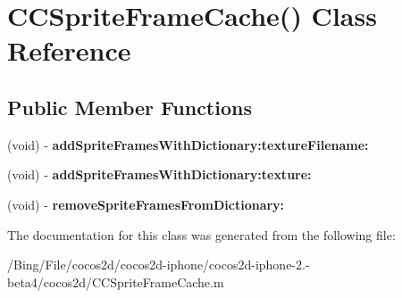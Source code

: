\hypertarget{interface_c_c_sprite_frame_cache_07_08}{\section{C\-C\-Sprite\-Frame\-Cache() Class Reference}
\label{interface_c_c_sprite_frame_cache_07_08}
}
\subsection*{Public Member Functions}
\begin{DoxyCompactItemize}
\item 
\hypertarget{interface_c_c_sprite_frame_cache_07_08_a87fa18af068793b885ccdc8ddec28c08}{(void) -\/ {\bfseries add\-Sprite\-Frames\-With\-Dictionary\-:texture\-Filename\-:}}\label{interface_c_c_sprite_frame_cache_07_08_a87fa18af068793b885ccdc8ddec28c08}

\item 
\hypertarget{interface_c_c_sprite_frame_cache_07_08_a539dc5fff1466f30d4b780003cdf7603}{(void) -\/ {\bfseries add\-Sprite\-Frames\-With\-Dictionary\-:texture\-:}}\label{interface_c_c_sprite_frame_cache_07_08_a539dc5fff1466f30d4b780003cdf7603}

\item 
\hypertarget{interface_c_c_sprite_frame_cache_07_08_a7d9c4b4256c1e30dad62e4c362f3d8ab}{(void) -\/ {\bfseries remove\-Sprite\-Frames\-From\-Dictionary\-:}}\label{interface_c_c_sprite_frame_cache_07_08_a7d9c4b4256c1e30dad62e4c362f3d8ab}

\end{DoxyCompactItemize}


The documentation for this class was generated from the following file\-:\begin{DoxyCompactItemize}
\item 
/\-Bing/\-File/cocos2d/cocos2d-\/iphone/cocos2d-\/iphone-\/2.-\/beta4/cocos2d/C\-C\-Sprite\-Frame\-Cache.\-m\end{DoxyCompactItemize}
